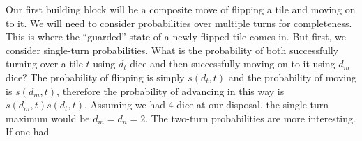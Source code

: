 \documentclass[letterpaper]{article}
\begin{document}
Our first building block will be a composite move of flipping a tile and
moving on to it.  We will need to consider probabilities over multiple turns
for completeness.  This is where the ``guarded'' state of a newly-flipped tile
comes in.  But first, we consider single-turn probabilities.  What is the
probability of both successfully turning over a tile $t$ using $d_t$ dice and
then successfully moving on to it using $d_m$ dice?  The probability of
flipping is simply $s(d_t,t)$ and the probability of moving is $s(d_m,t)$,
therefore the probability of advancing in this way is $s(d_m,t)s(d_t,t)$.
Assuming we had 4 dice at our disposal, the single turn maximum would be
$d_m=d_n=2$.  The two-turn probabilities are more interesting.  If one had 
\end{document}
